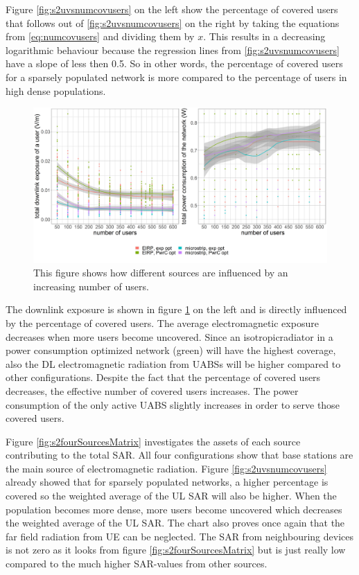 Figure \ref{fig:s2uvsnumcovusers} on the left show the percentage of covered users that follows out of \ref{fig:s2uvsnumcovusers} on the right by taking the equations from \ref{eq:numcovusers} and dividing them by $x$.
This results in a decreasing logarithmic behaviour because the regression lines from  \ref{fig:s2uvsnumcovusers} have a slope of less then 0.5.
So in other words, the  percentage of covered users for a sparsely populated network is more compared to the percentage of users in high dense populations.

\begin{figure}[h!]
  \includegraphics[width=\textwidth]{../results/s2/uvsdlAndPc.png}
  \caption{This figure shows how different sources are influenced by an increasing number of users. }
  \label{fig:s2b_dlAndPc}
\end{figure}

The downlink exposure is shown in figure \ref{fig:s2b_dlAndPc} on the left and is directly influenced by the percentage of covered users. 
The average electromagnetic exposure decreases when more users become uncovered. Since an \gls{isotropicradiator} in a power consumption optimized network (green)
will have the highest coverage, also the \gls{DL} electromagnetic radiation from \gls{UABS}s will be higher compared to other configurations.
Despite the fact that the percentage of covered users decreases, the effective number of covered users increases. The power consumption of the only 
active \gls{UABS} slightly increases in order to serve those covered users.


Figure \ref{fig:s2fourSourcesMatrix} investigates the assets of each source contributing to the total \gls{SAR}. All four 
configurations show that base stations are the main source of electromagnetic radiation.
Figure \ref{fig:s2uvsnumcovusers} already 
showed that for sparsely populated networks, a higher percentage is covered so the weighted average of the \gls{UL} \gls{SAR} will also be higher. 
When the population becomes more dense,
more users become uncovered which decreases the weighted average of the \gls{UL} \gls{SAR}.
The chart also proves once again that the far field radiation from \gls{UE} can be neglected. The \gls{SAR} from 
neighbouring devices is not zero as it looks from figure \ref{fig:s2fourSourcesMatrix} but is just really low compared to the much higher
\gls{SAR}-values from other sources.

